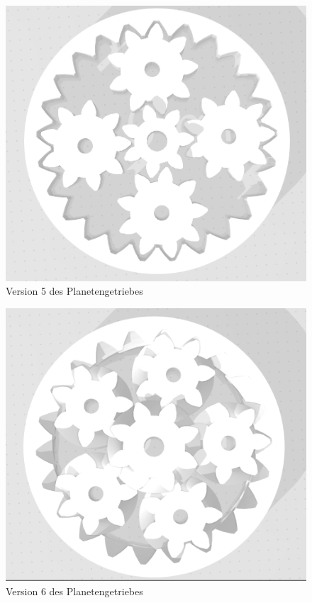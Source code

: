 \begin{figure}[!ht]
	\centering
	\includegraphics[width=\textwidth]{bilder/GetriebeVersion4-2.png}
	\caption{Version 5 des Planetengetriebes}
	\label{bild:gearversion4-2}
\end{figure}
\begin{figure}[!ht]
	\centering
	\includegraphics[width=\textwidth]{bilder/GetriebeVersion4-3.png}
	\caption{Version 6 des Planetengetriebes}
	\label{bild:gearversion4-3}
\end{figure}
